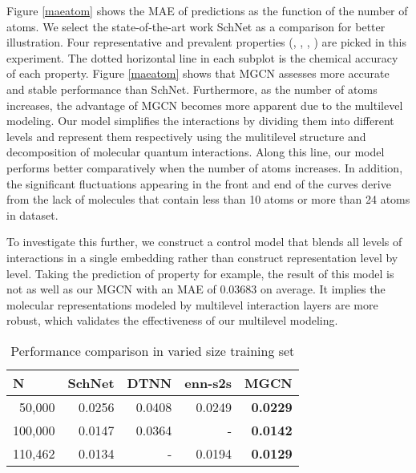 \documentclass[letterpaper]{article} \usepackage{bm}
\begin{document}
 Figure \ref{maeatom} shows the MAE of predictions as the function of the number of atoms. We select the state-of-the-art work SchNet as a comparison for better illustration. Four representative and prevalent properties (, , , ) are picked in this experiment. The dotted horizontal line in each subplot is the chemical accuracy of each property. Figure \ref{maeatom} shows that MGCN assesses more accurate and stable performance than SchNet. Furthermore, as the number of atoms increases, the advantage of MGCN becomes more apparent due to the multilevel modeling. Our model simplifies the interactions by dividing them into different levels and represent them respectively using the mulitilevel structure and decomposition of molecular quantum interactions. Along this line, our model performs better comparatively when the number of atoms increases. In addition, the significant fluctuations appearing in the front and end of the curves derive from the lack of molecules that contain less than 10 atoms or more than 24 atoms in dataset.  
 
 To investigate this further, we construct a control model that blends all levels of interactions in a single embedding rather than construct representation level by level. Taking the prediction of  property for example, the result of this model is not as well as our MGCN with an MAE of 0.03683 on average. It implies the molecular representations modeled by multilevel interaction layers are more robust, which validates the effectiveness of our multilevel modeling.
 
 

\begin{table}[tbp]
\centering
\caption{Performance comparison in varied size training set}
\begin{tabular}{rrrrr}
    \toprule

    \multicolumn{1}{l}{N} & \multicolumn{1}{l}{SchNet} & \multicolumn{1}{l}{DTNN} & \multicolumn{1}{l}{enn-s2s} & \multicolumn{1}{l}{MGCN} \\
    \midrule
    \midrule
    50,000 & 0.0256 & 0.0408 &  0.0249& \textbf{0.0229} \\
    100,000 & 0.0147 & 0.0364 & - & \textbf{0.0142} \\
    110,462 & 0.0134 & -      & 0.0194 & \textbf{0.0129} \\
    \bottomrule

\end{tabular}

\label{size}\end{table}
\end{document}
